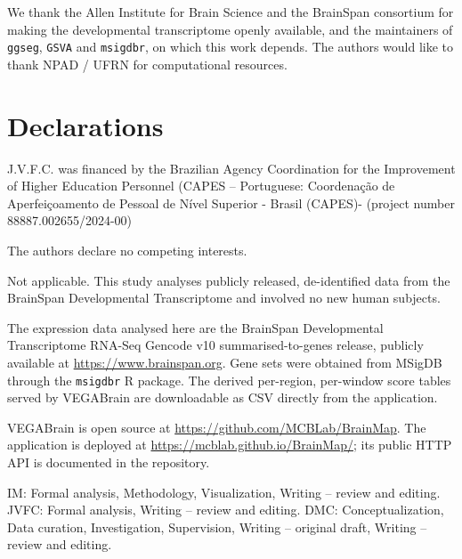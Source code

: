\documentclass[pdflatex,sn-basic]{sn-jnl}
\begin{document}
\backmatter


We thank the Allen Institute for Brain Science and the BrainSpan consortium for
making the developmental transcriptome openly available, and the maintainers of
\texttt{ggseg}, \texttt{GSVA} and \texttt{msigdbr}, on which this work depends.
The authors would like to thank NPAD / UFRN for computational resources.

\section*{Declarations}

J.V.F.C. was financed by the Brazilian Agency Coordination for the Improvement of Higher Education Personnel (CAPES – Portuguese: Coordenação de Aperfeiçoamento de Pessoal de Nível Superior - Brasil (CAPES)- (project number 88887.002655/2024-00)

The authors declare no competing interests.

Not applicable. This study analyses publicly released, de-identified data from
the BrainSpan Developmental Transcriptome and involved no new human subjects.

The expression data analysed here are the BrainSpan Developmental Transcriptome
RNA-Seq Gencode v10 summarised-to-genes release, publicly available at
\url{https://www.brainspan.org}. Gene sets were obtained from MSigDB through the
\texttt{msigdbr} R package. The derived per-region, per-window score tables
served by VEGABrain are downloadable as CSV directly from the application.

VEGABrain is open source at \url{https://github.com/MCBLab/BrainMap}. The
application is deployed at \url{https://mcblab.github.io/BrainMap/}; its public
HTTP API is documented in the repository.

IM: Formal analysis, Methodology, Visualization, Writing – review and editing. 
JVFC: Formal analysis, Writing – review and editing. 
DMC: Conceptualization, Data curation, Investigation, Supervision, Writing – original draft, Writing – review and editing.

\bigskip


\end{document}
